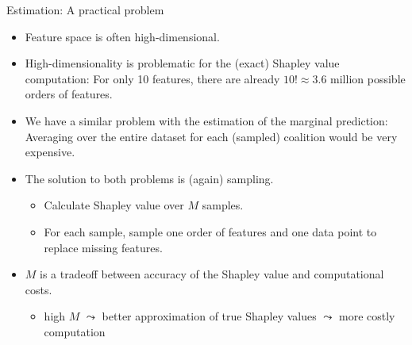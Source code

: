 \documentclass[aspectratio=169]{../latex_main/tntbeamer}  %
\begin{document}
\begin{frame}{Estimation: A practical problem}
  \begin{itemize}
      \item Feature space is often high-dimensional.
      \item High-dimensionality is problematic for the (exact) Shapley value computation: For only 10 features, there are already $10! \approx 3.6$ million possible orders of features.
      \item We have a similar problem with the estimation of the marginal prediction: Averaging over the entire dataset for each (sampled) coalition would be very expensive.
      \pause
      \item The solution to both problems is (again) sampling. 
      \begin{itemize}
          \item Calculate Shapley value over $M$ samples. 
          \item For each sample, sample one order of features and one data point to replace missing features.
      \end{itemize}
      \item $M$ is a tradeoff between accuracy of the Shapley value and computational costs. 
      \begin{itemize}
          \item high $M$ $\leadsto$ better approximation of true Shapley values $\leadsto$ more costly computation
      \end{itemize}
  \end{itemize}
\end{frame}

\newcommand{\xk}{\mathbf{x}^{(k)}}
\end{document}
